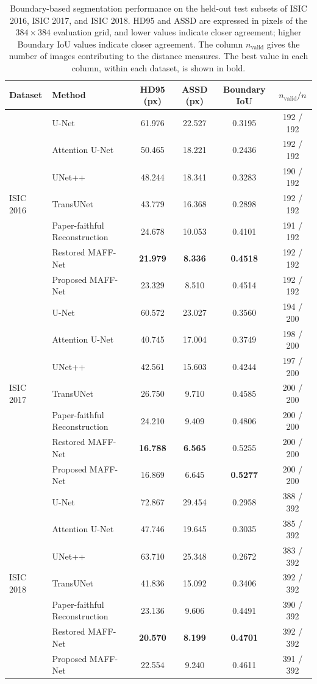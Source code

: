 \begin{table}[!t]
\centering
\caption{Boundary-based segmentation performance on the held-out test subsets of
ISIC 2016, ISIC 2017, and ISIC 2018. HD95 and ASSD are expressed in pixels of
the $384\times384$ evaluation grid, and lower values indicate closer agreement;
higher Boundary IoU values indicate closer agreement. The column
$n_{\mathrm{valid}}$ gives the number of images contributing to the distance
measures. The best value in each column, within each dataset, is shown in bold.}
\label{tab:boundary}
\setlength{\tabcolsep}{6pt}
\footnotesize
\begin{tabular}{llcccc}
\toprule
Dataset & Method & HD95 (px) & ASSD (px) & Boundary IoU & $n_{\mathrm{valid}}/n$ \\
\midrule
\multirow{7}{*}{ISIC 2016}
 & U-Net & 61.976 & 22.527 & 0.3195 & 192 / 192 \\
 & Attention U-Net & 50.465 & 18.221 & 0.2436 & 192 / 192 \\
 & UNet++ & 48.244 & 18.341 & 0.3283 & 190 / 192 \\
 & TransUNet & 43.779 & 16.368 & 0.2898 & 192 / 192 \\
 & Paper-faithful Reconstruction & 24.678 & 10.053 & 0.4101 & 191 / 192 \\
 & Restored MAFF-Net & \textbf{21.979} & \textbf{8.336} & \textbf{0.4518} & 192 / 192 \\
 & Proposed MAFF-Net & 23.329 & 8.510 & 0.4514 & 192 / 192 \\
\midrule
\multirow{7}{*}{ISIC 2017}
 & U-Net & 60.572 & 23.027 & 0.3560 & 194 / 200 \\
 & Attention U-Net & 40.745 & 17.004 & 0.3749 & 198 / 200 \\
 & UNet++ & 42.561 & 15.603 & 0.4244 & 197 / 200 \\
 & TransUNet & 26.750 & 9.710 & 0.4585 & 200 / 200 \\
 & Paper-faithful Reconstruction & 24.210 & 9.409 & 0.4806 & 200 / 200 \\
 & Restored MAFF-Net & \textbf{16.788} & \textbf{6.565} & 0.5255 & 200 / 200 \\
 & Proposed MAFF-Net & 16.869 & 6.645 & \textbf{0.5277} & 200 / 200 \\
\midrule
\multirow{7}{*}{ISIC 2018}
 & U-Net & 72.867 & 29.454 & 0.2958 & 388 / 392 \\
 & Attention U-Net & 47.746 & 19.645 & 0.3035 & 385 / 392 \\
 & UNet++ & 63.710 & 25.348 & 0.2672 & 383 / 392 \\
 & TransUNet & 41.836 & 15.092 & 0.3406 & 392 / 392 \\
 & Paper-faithful Reconstruction & 23.136 & 9.606 & 0.4491 & 390 / 392 \\
 & Restored MAFF-Net & \textbf{20.570} & \textbf{8.199} & \textbf{0.4701} & 392 / 392 \\
 & Proposed MAFF-Net & 22.554 & 9.240 & 0.4611 & 391 / 392 \\
\bottomrule
\end{tabular}
\end{table}

